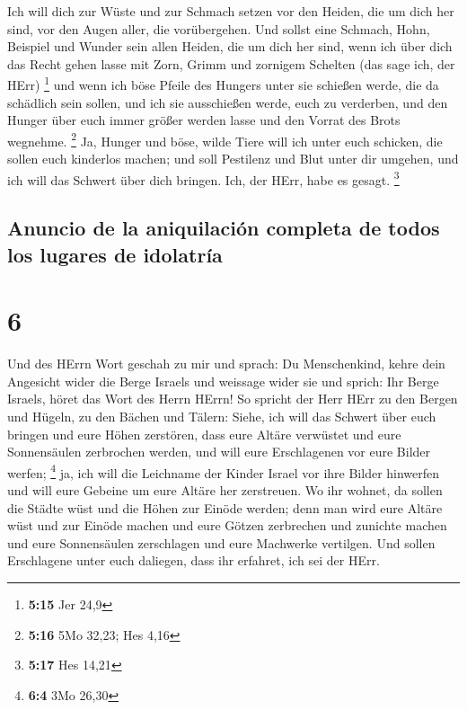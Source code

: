  Ich will dich zur Wüste und zur Schmach setzen vor den
Heiden, die um dich her sind, vor den Augen aller, die vorübergehen.
 Und sollst eine Schmach, Hohn, Beispiel und Wunder sein
allen Heiden, die um dich her sind, wenn ich über dich das Recht gehen
lasse mit Zorn, Grimm und zornigem Schelten (das sage ich, der HErr)
\footnote{\textbf{5:15} Jer 24,9}  und wenn ich böse
Pfeile des Hungers unter sie schießen werde, die da schädlich sein
sollen, und ich sie ausschießen werde, euch zu verderben, und den Hunger
über euch immer größer werden lasse und den Vorrat des Brots wegnehme.
\footnote{\textbf{5:16} 5Mo 32,23; Hes 4,16}  Ja, Hunger
und böse, wilde Tiere will ich unter euch schicken, die sollen euch
kinderlos machen; und soll Pestilenz und Blut unter dir umgehen, und ich
will das Schwert über dich bringen. Ich, der HErr, habe es gesagt.
\footnote{\textbf{5:17} Hes 14,21}

\hypertarget{anuncio-de-la-aniquilaciuxf3n-completa-de-todos-los-lugares-de-idolatruxeda}{%
\subsection{Anuncio de la aniquilación completa de todos los lugares de
idolatría}\label{anuncio-de-la-aniquilaciuxf3n-completa-de-todos-los-lugares-de-idolatruxeda}}

\hypertarget{section-5}{%
\section{6}\label{section-5}}

 Und des HErrn Wort geschah zu mir und sprach:
 Du Menschenkind, kehre dein Angesicht wider die Berge
Israels und weissage wider sie  und sprich: Ihr Berge
Israels, höret das Wort des Herrn HErrn! So spricht der Herr HErr zu den
Bergen und Hügeln, zu den Bächen und Tälern: Siehe, ich will das Schwert
über euch bringen und eure Höhen zerstören,  dass eure
Altäre verwüstet und eure Sonnensäulen zerbrochen werden, und will eure
Erschlagenen vor eure Bilder werfen; \footnote{\textbf{6:4} 3Mo 26,30}
 ja, ich will die Leichname der Kinder Israel vor ihre
Bilder hinwerfen und will eure Gebeine um eure Altäre her zerstreuen.
 Wo ihr wohnet, da sollen die Städte wüst und die Höhen
zur Einöde werden; denn man wird eure Altäre wüst und zur Einöde machen
und eure Götzen zerbrechen und zunichte machen und eure Sonnensäulen
zerschlagen und eure Machwerke vertilgen.  Und sollen
Erschlagene unter euch daliegen, dass ihr erfahret, ich sei der HErr.

